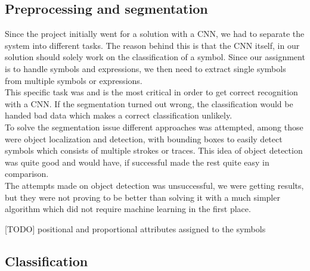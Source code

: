 \subsection{Preprocessing and segmentation}
Since the project initially went for a solution with a CNN, we had to separate the system into different tasks. The reason behind this is that the CNN itself, in our solution should solely work on the classification of a symbol. Since our assignment is to handle symbols and expressions, we then need to extract single symbols from multiple symbols or expressions.\\
This specific task was and is the most critical in order to get correct recognition with a CNN. If the segmentation turned out wrong, the classification would be handed bad data which makes a correct classification unlikely.\\ To solve the segmentation issue different approaches was attempted, among those were object localization and detection, with bounding boxes to easily detect symbols which consists of multiple strokes or traces. This idea of object detection was quite good and would have, if successful made the rest quite easy in comparison.\\ The attempts made on object detection was unsuccessful, we were getting results, but they were not proving to be better than solving it with a much simpler algorithm which did not require machine learning in the first place. 

[TODO] positional and proportional attributes assigned to the symbols


\subsection{Classification}

